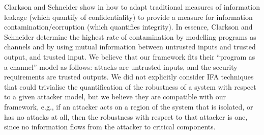 {{Clarkson and Schneider show in \cite{QuantitativeIntegrity} how to adapt traditional measures of information leakage (which quantify of confidentiality) to provide a measure for information contamination/corruption (which quantifies integrity). In essence, Clarkson and Schneider determine the highest rate of contamination by modelling programs as channels and by using mutual information between untrusted inputs and trusted output, and trusted input. We believe that our framework fits their ``program as a channel''-model as follows: attacks are untrusted inputs, and the security requirements are trusted outputs. We did not explicitly consider IFA techniques that could trivialise the quantification of the robustness of a system with respect to a given attacker model, but we believe they are compatible with our framework, e.g., if an attacker acts on a region of the system that is isolated, or has no attacks at all, then the robustness with respect to that attacker is one, since no information flows from the attacker to critical components.





{
}}}
